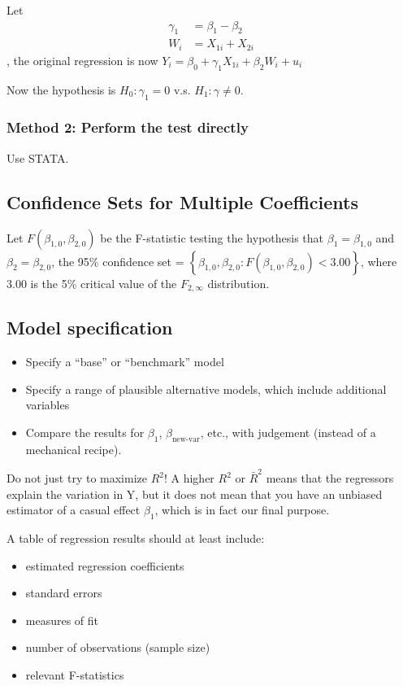 \documentclass{article}
\begin{document}
Let
\[
	\begin{aligned}
		\gamma_1 & = \beta_1 - \beta_2 \\
		W_i      & = X_{1i} + X_{2i}
	\end{aligned}
\],
the original regression is now $Y_i = \beta_0 + \gamma_1 X_{1i} + \beta_2 W_i + u_i$

Now the hypothesis is $H_0: \gamma_1 = 0$ v.s. $H_1: \gamma \neq 0$.

\subsubsection{Method 2: Perform the test directly}

Use STATA.

\subsection{Confidence Sets for Multiple Coefficients}

Let $F(\beta_{1,0}, \beta_{2,0})$ be the F-statistic testing the hypothesis that $\beta_1 = \beta_{1,0}$ and $\beta_2 = \beta_{2,0}$,
the 95\% confidence set = $\left\{ \beta_{1,0}, \beta_{2,0}: F(\beta_{1,0}, \beta_{2,0}) < 3.00 \right\}$,
where 3.00 is the 5\% critical value of the $F_{2, \infty}$ distribution.

\subsection{Model specification}

\begin{itemize}
	\item Specify a ``base'' or ``benchmark'' model
	\item Specify a range of plausible alternative models, which include additional variables
	\item Compare the results for $\beta_1$, $\beta_{\text{new-var}}$, etc.,
	      with judgement (instead of a mechanical recipe).
\end{itemize}

Do not just try to maximize $R^2$!
A higher $R^2$ or $\bar{R}^2$ means that the regressors explain the variation in Y,
but it does not mean that you have an unbiased estimator of a casual effect $\beta_1$,
which is in fact our final purpose.

A table of regression results should at least include:
\begin{itemize}
	\item estimated regression coefficients
	\item standard errors
	\item measures of fit
	\item number of observations (sample size)
	\item relevant F-statistics
\end{itemize}
\end{document}
